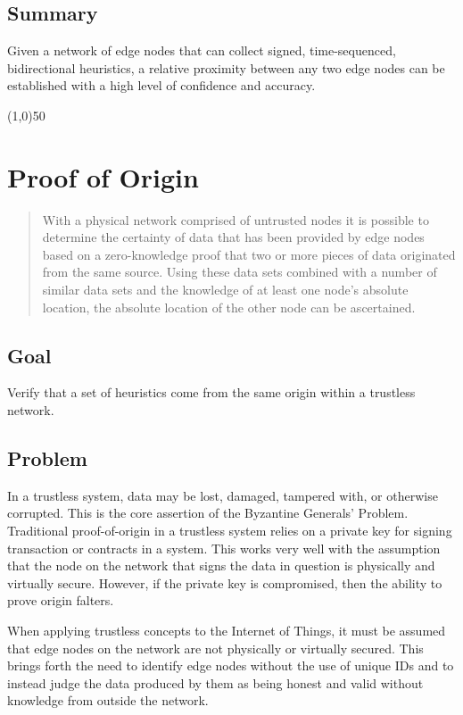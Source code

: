 \documentclass{article}
\begin{document}
\subsection {Summary}
Given a network of edge nodes that can collect signed, time-sequenced, bidirectional \glspl{heuristic}, a relative proximity between any two edge nodes can be established with a high level of confidence and \gls{accuracy}.

\begin{center}
\line(1,0){50}
\end{center}

\section {Proof of Origin}

\begin{abstract}
With a physical network comprised of untrusted nodes it is possible to determine the \gls{certainty} of data that has been provided by edge nodes based on a zero-knowledge proof that two or more pieces of data originated from the same source. Using these data sets combined with a number of similar data sets and the knowledge of at least one node's absolute location, the absolute location of the other node can be ascertained.
\end{abstract}

\subsection {Goal}
Verify that a set of \glspl{heuristic} come from the same origin within a trustless network.

\subsection {Problem}
In a trustless system, data may be lost, damaged, tampered with, or otherwise corrupted. This is the core assertion of the Byzantine Generals' Problem. Traditional \Gls{proof-of-origin} in a trustless system relies on a private key for signing transaction or contracts in a system. This works very well with the assumption that the node on the network that signs the data in question is physically and virtually secure. However, if the private key is compromised, then the ability to prove origin falters.

When applying trustless concepts to the Internet of Things, it must be assumed that edge nodes on the network are not physically or virtually secured. This brings forth the need to identify edge nodes without the use of unique IDs and to instead judge the data produced by them as being honest and valid without knowledge from outside the network.
\end{document}
